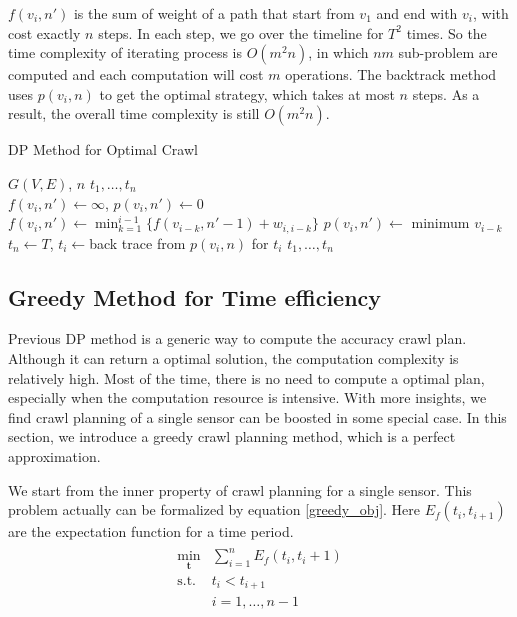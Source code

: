 \documentclass[conference]{IEEEtran}
\begin{document}
$f(v_i,n')$ is the sum of weight of a path that start from $v_1$ and end with $v_i$, with cost exactly $n$ steps. In each step, we go over the timeline for $T^2$ times.
So the time complexity of iterating process is $O(m^2n)$, in which $nm$ sub-problem are computed and each computation will cost $m$ operations. 
The backtrack method uses $p(v_i, n)$ to get the optimal strategy, which takes at most $n$ steps. 
As a result, the overall time complexity is still $O(m^2n)$.
\begin{algorithm}
\caption{DP Method for Optimal Crawl}
\label{alg:dp_min}
\begin{algorithmic}[1]
	\renewcommand{\algorithmicrequire}{\textbf{Input:}}
	\renewcommand{\algorithmicensure}{\textbf{Output:}}
	\REQUIRE $G(V,E)$, $n$
	\ENSURE  $t_1,\ldots,t_n$
	\\
	\STATE $f(v_i,n') \gets \infty$, $p(v_i,n')\gets 0$
	\STATE $f(v_i,n')\gets\min_{k=1}^{i-1}\{f(v_{i-k}, n'-1)+w_{i,i-k}\}$
	\STATE $p(v_i,n')\gets$ minimum $v_{i-k}$
	\ENDFOR
	\ENDFOR
	\STATE $t_n\gets T$, $t_i\gets$back trace from $p(v_i, n)$ for $t_i$
	\RETURN $t_1,\ldots,t_n$
\end{algorithmic}
\end{algorithm}

\subsection{Greedy Method for Time efficiency}

Previous DP method is a generic way to compute the accuracy crawl plan. 
Although it can return a optimal solution, the computation complexity is relatively high.
Most of the time, there is no need to compute a optimal plan, especially when the computation resource is intensive.
With more insights, we find crawl planning of a single sensor can be boosted in some special case.
In this section, we introduce a greedy crawl planning method, which is a perfect approximation.

We start from the inner property of crawl planning for a single sensor. 
This problem actually can be formalized by equation \ref{greedy_obj}. 
Here $E_f(t_i,t_{i+1})$ are the expectation function for a time period.
\begin{eqnarray}
\begin{array}{ll}
\min_{\textbf{t}}& \sum_{i=1}^{n} E_f(t_i,t_i+1)\\
\text{s.t.}
& t_i < t_{i+1}\\
& i=1,\ldots,n-1
\end{array}\label{greedy_obj}
\end{eqnarray}
\end{document}
